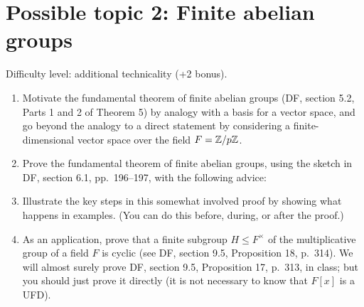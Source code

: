 \documentclass[11pt, reqno]{amsart}
\begin{document}
\section*{Possible topic 2: Finite abelian groups}
Difficulty level: additional technicality (+2 bonus).
\begin{enumerate}
\item Motivate the fundamental theorem of finite abelian groups (DF, section 5.2, 
Parts 1 and 2 of Theorem 5) by analogy with a basis for a vector space, and go 
beyond the analogy to a direct statement by considering a finite-dimensional vector
space over the field $F=\mathbb{Z}/p\mathbb{Z}$.    
\item Prove the fundamental theorem of finite abelian groups, using the sketch in 
DF, section 6.1, pp.~196--197, with the following advice:
\item Illustrate the key steps in this somewhat involved proof by showing what 
happens in examples.  (You can do this before, during, or after the proof.)
\item As an application, prove that a finite subgroup $H \leq F^\times$ of the 
multiplicative group of a field $F$ is cyclic (see DF, section 9.5, Proposition 18,
p.~314).  We will almost surely prove DF, section 9.5, Proposition 17, p.~313, in 
class; but you should just prove it directly (it is not necessary to know that 
$F[x]$ is a UFD).
\end{enumerate}
\end{document}

